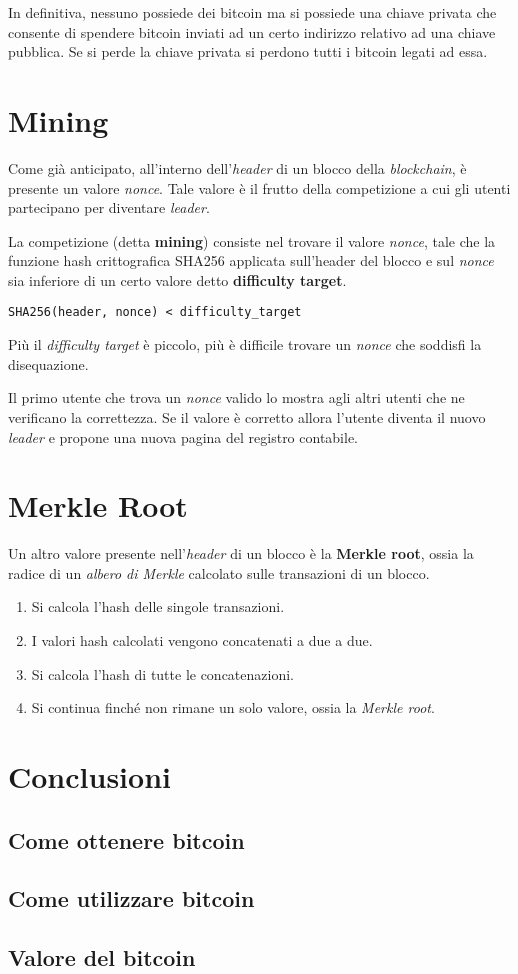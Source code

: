 In definitiva, nessuno possiede dei bitcoin ma si possiede una chiave privata che consente di spendere bitcoin inviati
ad un certo indirizzo relativo ad una chiave pubblica. Se si perde la chiave privata si perdono tutti i bitcoin
legati ad essa.

\section{Mining}
Come gi\`a anticipato, all'interno dell'\emph{header} di un blocco della \emph{blockchain}, \`e presente un valore
\emph{nonce}. Tale valore \`e il frutto della competizione a cui gli utenti partecipano per diventare \emph{leader}.

La competizione (detta \textbf{mining}) consiste nel trovare il valore \emph{nonce}, tale che la funzione hash
crittografica SHA256 applicata sull'header del blocco e sul \emph{nonce} sia inferiore di un certo valore detto
\textbf{difficulty target}.
\begin{center}
	\verb|SHA256(header, nonce) < difficulty_target|
\end{center}
Pi\`u il \emph{difficulty target} \`e piccolo, pi\`u \`e difficile trovare un \emph{nonce} che soddisfi la disequazione.

Il primo utente che trova un \emph{nonce} valido lo mostra agli altri utenti che ne verificano la correttezza. Se
il valore \`e corretto allora l'utente diventa il nuovo \emph{leader} e propone una nuova pagina del registro contabile.

\section{Merkle Root}
Un altro valore presente nell'\emph{header} di un blocco \`e la \textbf{Merkle root}, ossia la radice di un
\emph{albero di Merkle} calcolato sulle transazioni di un blocco.
\begin{enumerate}
	\item Si calcola l'hash delle singole transazioni.
	\item I valori hash calcolati vengono concatenati a due a due.
	\item Si calcola l'hash di tutte le concatenazioni.
	\item Si continua finch\'e non rimane un solo valore, ossia la \emph{Merkle root}.
\end{enumerate}

\section{Conclusioni}
\subsection{Come ottenere bitcoin}
\subsection{Come utilizzare bitcoin}
\subsection{Valore del bitcoin}